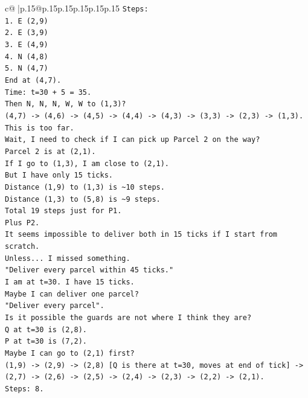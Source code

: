 \documentclass{article}
\begin{document}
{\begin{supertabular}{c@{$\;$}|p{.15\linewidth}@{}p{.15\linewidth}p{.15\linewidth}p{.15\linewidth}p{.15\linewidth}p{.15\linewidth}}
{{{\texttt{Steps:} \\
\texttt{1. E (2,9)} \\
\texttt{2. E (3,9)} \\
\texttt{3. E (4,9)} \\
\texttt{4. N (4,8)} \\
\texttt{5. N (4,7)} \\
\texttt{End at (4,7).} \\
\texttt{Time: t=30 + 5 = 35.} \\
\texttt{Then N, N, N, W, W to (1,3)?} \\
\texttt{(4,7) {-}> (4,6) {-}> (4,5) {-}> (4,4) {-}> (4,3) {-}> (3,3) {-}> (2,3) {-}> (1,3).} \\
\texttt{This is too far.} \\
\texttt{Wait, I need to check if I can pick up Parcel 2 on the way?} \\
\texttt{Parcel 2 is at (2,1).} \\
\texttt{If I go to (1,3), I am close to (2,1).} \\
\texttt{But I have only 15 ticks.} \\
\texttt{Distance (1,9) to (1,3) is \textasciitilde{}10 steps.} \\
\texttt{Distance (1,3) to (5,8) is \textasciitilde{}9 steps.} \\
\texttt{Total 19 steps just for P1.} \\
\texttt{Plus P2.} \\
\texttt{It seems impossible to deliver both in 15 ticks if I start from scratch.} \\
\texttt{Unless... I missed something.} \\
\texttt{"Deliver every parcel within 45 ticks."} \\
\texttt{I am at t=30. I have 15 ticks.} \\
\texttt{Maybe I can deliver one parcel?} \\
\texttt{"Deliver every parcel".} \\
\texttt{Is it possible the guards are not where I think they are?} \\
\texttt{Q at t=30 is (2,8).} \\
\texttt{P at t=30 is (7,2).} \\
\texttt{Maybe I can go to (2,1) first?} \\
\texttt{(1,9) {-}> (2,9) {-}> (2,8) {[}Q is there at t=30, moves at end of tick{]} {-}> (2,7) {-}> (2,6) {-}> (2,5) {-}> (2,4) {-}> (2,3) {-}> (2,2) {-}> (2,1).} \\
\texttt{Steps: 8.} \\
}}}
\end{supertabular}}
\end{document}
